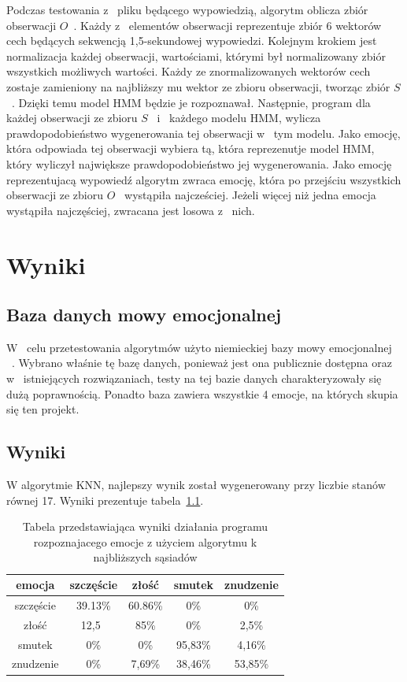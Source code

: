 \documentclass[declaration,shortabstract]{iithesis}
\begin{document}
Podczas testowania z~ pliku będącego wypowiedzią, algorytm oblicza zbiór obserwacji $O$~. Każdy z~ elementów obserwacji reprezentuje zbiór 6 wektorów cech będących sekwencją 1,5-sekundowej wypowiedzi. Kolejnym krokiem jest normalizacja każdej obserwacji, wartościami, którymi był normalizowany zbiór wszystkich możliwych wartości. Każdy ze znormalizowanych wektorów cech zostaje zamieniony na najbliższy mu wektor ze zbioru obserwacji, tworząc zbiór $S$~. Dzięki temu model HMM będzie je rozpoznawał. Następnie, program dla każdej obserwacji ze zbioru $S$~ i~ każdego modelu HMM, wylicza prawdopodobieństwo wygenerowania tej obserwacji w~ tym modelu. Jako emocję, która odpowiada tej obserwacji wybiera tą, która reprezenutje model HMM, który wyliczył największe prawdopodobieństwo jej wygenerowania. Jako emocję reprezentujacą wypowiedź algorytm zwraca emocję, która po przejściu wszystkich obserwacji ze zbioru $O$~ wystąpiła najcześciej. Jeżeli więcej niż jedna emocja wystąpiła najczęściej, zwracana jest losowa z~ nich.

\chapter{Wyniki}
\section{Baza danych mowy emocjonalnej}
W~ celu przetestowania algorytmów użyto niemieckiej bazy mowy emocjonalnej ~\cite{BDemo}. Wybrano właśnie tę bazę danych, ponieważ jest ona publicznie dostępna oraz w~ istniejących rozwiązaniach, testy na tej bazie danych charakteryzowały się dużą poprawnością. Ponadto baza zawiera wszystkie 4 emocje, na których skupia się ten projekt.

\section{Wyniki}
W algorytmie KNN, najlepszy wynik został wygenerowany przy liczbie stanów równej 17. Wyniki prezentuje tabela~\ref{KNN_result}.

\begin{table}[p]
\caption{Tabela przedstawiająca wyniki działania programu rozpoznajacego emocje z użyciem algorytmu k najbliższych sąsiadów}
\begin{center}
  \begin{tabular}{|c|c|c|c|c|}
    \hline
    emocja & szczęście & złość & smutek & znudzenie \\ \hline
    szczęście & 39.13\% & 60.86\% & 0\% & 0\% \\ \hline
	złość & 12,5\ & 85\% & 0\% & 2,5\% \\ \hline
	smutek & 0\% & 0\% & 95,83\% & 4,16\% \\ \hline
	znudzenie & 0\% & 7,69\% & 38,46\% & 53,85\%\\ 
	\hline
  \end{tabular}
  \label{KNN_result}
\end{center}
\end{table}
\end{document}
